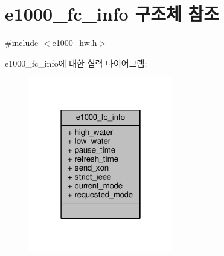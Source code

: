 \hypertarget{structe1000__fc__info}{}\section{e1000\+\_\+fc\+\_\+info 구조체 참조}
\label{structe1000__fc__info}


{\ttfamily \#include $<$e1000\+\_\+hw.\+h$>$}



e1000\+\_\+fc\+\_\+info에 대한 협력 다이어그램\+:
\nopagebreak
\begin{figure}[H]
\begin{center}
\leavevmode
\includegraphics[width=178pt]{structe1000__fc__info__coll__graph}
\end{center}
\end{figure}
